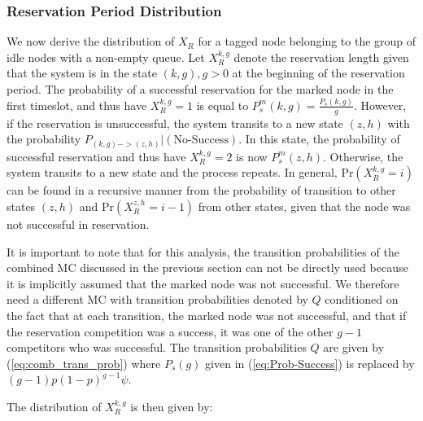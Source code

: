 \documentclass[12pt,journal,oneside,onecolumn]{IEEEtran}
\begin{document}
\subsubsection{Reservation Period Distribution}
\label{sec:res_per_dist}

We now derive the distribution of $X_R$ for a tagged node belonging to the group of idle nodes with a non-empty queue.
Let $X_R^{k,g}$ denote the reservation length given that the system is in the state $(k,g), g>0$ at the beginning of the reservation period.
The probability of a successful reservation for the marked node in the first timeslot, and thus have $X_R^{k,g}=1$ is equal to $P^m_s(k,g)=\frac{P_s(k,g)}{g}$. 
However, if the reservation is unsuccessful, the system transits to a new state $(z,h)$ with the probability $P_{(k,g)->(z,h)}|{(\text{No-Success})}$. 
In this state, the probability of successful reservation and thus have  $X_R^{k,g}=2$ is now $P^m_s(z,h)$. 
Otherwise, the system transits to a new state and the process repeats. In general, 
$\text{Pr}(X_R^{k,g}=i)$ can be found in a recursive manner from the probability of transition to other states $(z,h)$ and $\text{Pr}(X_R^{z,h}=i-1)$ from other states, given that the node was not successful in reservation. 

It is important to note that for this analysis, the transition probabilities of the combined MC discussed in the previous
section can not be directly used because it is implicitly assumed that the marked node was not 
successful. We therefore need a different MC with transition probabilities denoted by $Q$ conditioned on the fact
that at each transition, the marked node was not successful, and that if the reservation
competition was a success, it was one of the other $g-1$ competitors who was successful.  The transition probabilities $Q$
are given by (\ref{eq:comb_trans_prob}) where $P_s(g)$ given in (\ref{eq:Prob-Success}) is replaced by 
$(g-1) p (1-p)^{g-1} \psi$.

The distribution of $X_R^{k,g}$ is then given by:
\end{document}
